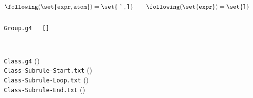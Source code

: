 \begin{frame}{}
  \[
    \following(\set{\texttt{expr}, \texttt{atom}}) = \set{\hat{\quad}, \texttt{]}} \qquad
    \following(\set{\texttt{expr}}) = \set{\texttt{]}}
  \]

  \vspace{-0.20cm}
  \begin{columns}
      \begin{center}

        \vspace{0.50cm}
        \texttt{Group.g4} \\[15pt]
      \end{center}
      \begin{center}

        \vspace{0.50cm}
        \texttt{[]}
      \end{center}
  \end{columns}

  \pause
  \vspace{0.60cm}
  \begin{center}
  \end{center}
\end{frame}

\begin{frame}{}
  \begin{center}

    \vspace{0.80cm}
     \\[20pt]

    \texttt{Class.g4} (\texttt{}) \\[20pt]
    \texttt{Class-Subrule-Start.txt} () \\[10pt]
    \texttt{Class-Subrule-Loop.txt} () \\[10pt]
    \texttt{Class-Subrule-End.txt} ()
  \end{center}
\end{frame}


